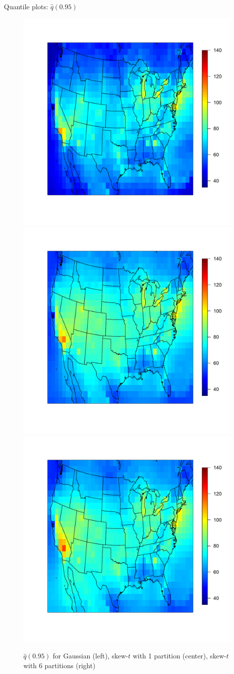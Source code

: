 \documentclass{beamer}
\begin{document}
\begin{frame}{Quantile plots: $\widehat{q}(0.95)$}
  \centering
  \begin{figure}
    \includegraphics[width=0.33\linewidth, trim=0.2in 0 0.2in 1in]{./plots/pot/ozone-q95-gaus.pdf}
    \includegraphics[width=0.33\linewidth, trim=0.2in 0 0.2in 1in]{./plots/pot/ozone-q95-t1.pdf}
    \includegraphics[width=0.33\linewidth, trim=0.2in 0 0.2in 1in]{./plots/pot/ozone-q95-t6.pdf}
    \caption{$\widehat{q}(0.95)$ for Gaussian (left), skew-$t$ with 1 partition (center), skew-$t$ with 6 partitions (right)}
  \end{figure}
\end{frame}
\end{document}
